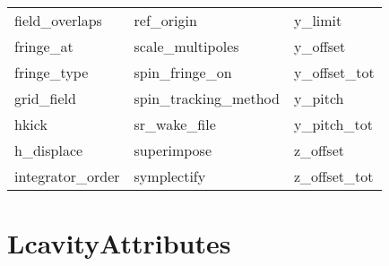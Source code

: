 \begin{tabular}{lll}
field_overlaps              & ref_origin                  & y_limit                     \\
fringe_at                   & scale_multipoles            & y_offset                    \\
fringe_type                 & spin_fringe_on              & y_offset_tot                \\
grid_field                  & spin_tracking_method        & y_pitch                     \\
hkick                       & sr_wake_file                & y_pitch_tot                 \\
h_displace                  & superimpose                 & z_offset                    \\
integrator_order            & symplectify                 & z_offset_tot                \\
 \bottomrule
 \end{tabular}
 \vfill
 
 \section{LcavityAttributes}
 \label{s:list.lcavity}
 
